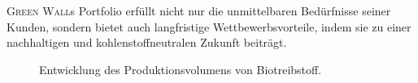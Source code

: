\textsc{Green Wall}s Portfolio erfüllt nicht nur die unmittelbaren Bedürfnisse seiner Kunden, sondern bietet auch langfristige Wettbewerbsvorteile, indem sie zu einer nachhaltigen und kohlenstoffneutralen Zukunft beiträgt.

\begin{figure}[h]
    \centering
    
    \caption[Entwicklung des Produktionsvolumens von Biotreibstoff]{Entwicklung des Produktionsvolumens von Biotreibstoff.}\label{fig:biofuel production}
\end{figure}